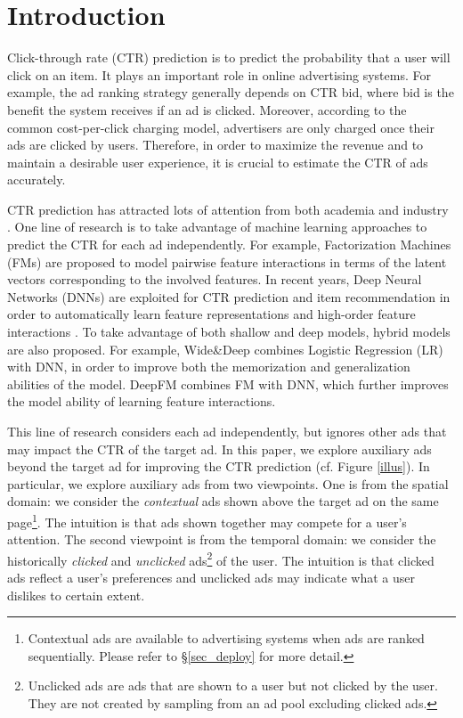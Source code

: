 \documentclass[sigconf]{acmart}
\begin{document}
\fancyhead{}

\maketitle

\section{Introduction}
Click-through rate (CTR) prediction is to predict the probability that a user will click on an item. It plays an important role in online advertising systems. For example, the ad ranking strategy generally depends on CTR  bid, where bid is the benefit the system receives if an ad is clicked. Moreover, according to the common cost-per-click charging model, advertisers are only charged once their ads are clicked by users. Therefore, in order to maximize the revenue and to maintain a desirable user experience, it is crucial to estimate the CTR of ads accurately.

CTR prediction has attracted lots of attention from both academia and industry \cite{he2014practical,cheng2016wide,shan2016deep,he2017neural,zhou2018deep}. One line of research is to take advantage of machine learning approaches to predict the CTR for each ad independently. For example, Factorization Machines (FMs) \cite{rendle2010factorization} are proposed to model pairwise feature interactions in terms of the latent vectors corresponding to the involved features.
In recent years, Deep Neural Networks (DNNs) are exploited for CTR prediction and item recommendation in order to automatically learn feature representations and high-order feature interactions \cite{van2013deep,zhang2016deep,covington2016deep}. To take advantage of both shallow and deep models, hybrid models are also proposed. For example, Wide\&Deep \cite{cheng2016wide} combines Logistic Regression (LR) with DNN, in order to improve both the memorization and generalization abilities of the model.
DeepFM \cite{guo2017deepfm} combines FM with DNN, which further improves the model ability of learning feature interactions.

This line of research considers each ad independently, but ignores other ads that may impact the CTR of the target ad.
In this paper, we explore auxiliary ads beyond the target ad for improving the CTR prediction (cf. Figure \ref{illus}). In particular, we explore auxiliary ads from two viewpoints. One is from the spatial domain: we consider the \emph{contextual} ads shown above the target ad on the same page\footnote{Contextual ads are available to advertising systems when ads are ranked sequentially. Please refer to \S\ref{sec_deploy} for more detail.}. The intuition is that ads shown together may compete for a user's attention. The second viewpoint is from the temporal domain: we consider the historically \emph{clicked} and \emph{unclicked} ads\footnote{Unclicked ads are ads that are shown to a user but not clicked by the user. They are not created by sampling from an ad pool excluding clicked ads.} of the user. The intuition is that clicked ads reflect a user's preferences and unclicked ads may indicate what a user dislikes to certain extent.
\end{document}
